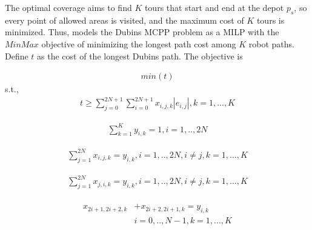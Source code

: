 \documentclass[journal,article,submit,pdftex,moreauthors]{Definitions/mdpi}
\begin{document}
The optimal coverage aims to find $K$ tours that start and end at the depot $p_s$, so every point of allowed areas is visited, and the maximum cost of $K$ tours is minimized. Thus,  models the Dubins MCPP problem as a MILP with the $MinMax$ objective of minimizing the longest path cost among $K$ robot paths. Define $t$ as the cost of the longest Dubins path. The objective is

\begin{equation}\label{Eq.objective}
\begin{aligned}
min(t)
\end{aligned}
\end{equation}
s.t.,
\begin{equation}\label{Eq.c2}
\begin{aligned}
t \geq \sum_{j=0}^{2N+1}\sum_{i=0}^{2N+1} x_{i,j,k}|e_{i,j}|, k=1,...,K
\end{aligned}
\end{equation}

\begin{equation}\label{Eq.c3}
\begin{aligned}
\sum_{k=1}^{K} y_{i,k} = 1, i=1,..,2N
\end{aligned}
\end{equation}

\begin{equation}\label{Eq.c4}
\begin{aligned}
\sum_{j=1}^{2N} x_{i,j,k} = y_{i,k}, i=1,..,2N, i \neq j, k=1,...,K
\end{aligned}
\end{equation}

\begin{equation}\label{Eq.c5}
\begin{aligned}
\sum_{j=1}^{2N} x_{j,i,k} = y_{i,k}, i=1,..,2N, i \neq j, k=1,...,K
\end{aligned}
\end{equation}


\begin{equation}\label{Eq.c6}
\begin{aligned}
\begin{split}
   x_{2i+1,2i+2,k} & + x_{2i+2,2i+1,k} = y_{i,k} \\
     & i= 0,..,N-1, k= 1,...,K
\end{split}
\end{aligned}
\end{equation}
\end{document}
